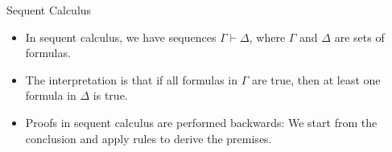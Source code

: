 \documentclass{beamer}
\begin{document}

\begin{frame}{Sequent Calculus}
  
\begin{itemize}
  \item In sequent calculus, we have sequences $\Gamma\vdash\Delta$, where $\Gamma$ and $\Delta$ are sets of formulas.
  \item The interpretation is that if all formulas in $\Gamma$ are true, then at least one formula in $\Delta$ is true.
  \item Proofs in sequent calculus are performed backwards: We start from the conclusion and apply rules to derive the premises.
\end{itemize}  
\end{frame}
  
\end{document}
